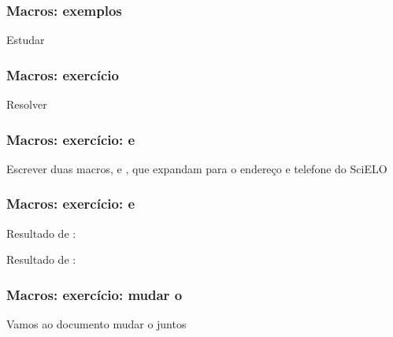 \begin{frame}
  \frametitle{Macros: exemplos}
  \huge
  Estudar 
\end{frame}

\begin{frame}
  \frametitle{Macros: exercício}
  \huge
  Resolver 
\end{frame}

\begin{frame}
  \frametitle{Macros: exercício: \latexcode{\address} e \latexcode{\telephone}}
  \LARGE
  Escrever duas macros, \latexcode{\address} e \latexcode{\telephone}, que
  expandam para o endereço e telefone do SciELO
\end{frame}

\begin{frame}
  \frametitle{Macros: exercício: \latexcode{\email} e \latexcode{\todo}}
  \LARGE
  Resultado de \latexcode{\email}: 
  \vspace{1em}

  Resultado de \latexcode{\todo}: 
\end{frame}

\begin{frame}
  \frametitle{Macros: exercício: mudar o \latexcode{\maketitle}}
  \LARGE
  Vamos ao documento mudar o \latexcode{\maketitle} juntos
\end{frame}
